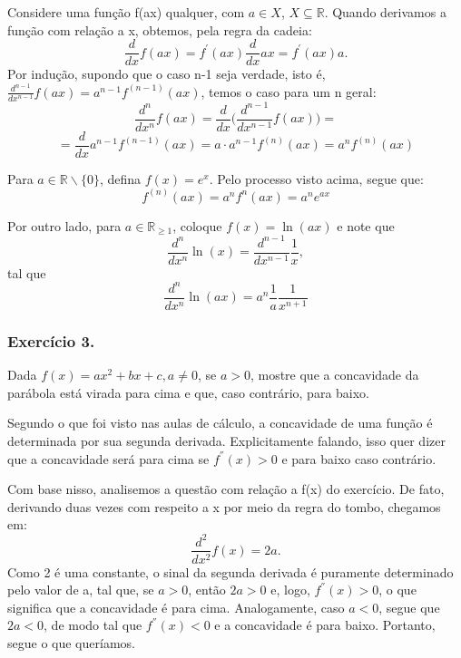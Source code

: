\begin{proof*}
	Considere uma fun\c c\~ao f(ax) qualquer, com $a\in{X}$, $X\subseteq{\mathbb{R}}$.
	Quando derivamos a fun\c c\~ao com rela\c c\~ao a x, obtemos, pela regra da
	cadeia:
	\[
		\frac{d}{dx}f(ax) = f^{'}(ax)\frac{d}{dx}ax = f^{'}(ax)a.
	\]
	Por indu\c c\~ao, supondo que o caso n-1 seja verdade, isto \'e,
	$\frac{d^{n-1}}{d x^{n-1}}f(ax) = a^{n-1}f^{(n-1)}(ax)$, temos o caso para um n
	geral:
	\[
		\frac{d^{n}}{d x^{n}}f(ax) = \frac{d}{dx}\biggl(\frac{d^{n-1}}{d x^{n-1}}f(ax)\biggr) =
	\]
	\[
		= \frac{d}{dx}a^{n-1}f^{(n-1)}(ax) = a\cdot{a^{n-1}}f^{(n)}(ax) = a^{n}f^{(n)}(ax)
	\]

	Para $a\in{\mathbb{R}\backslash\{0\}}$, defina $f(x) = e^{x}$. Pelo processo visto
	acima, segue que:
	\[
		f^{(n)}(ax) = a^{n}f^{n}(ax) = a^{n}e^{ax}
	\]

	Por outro lado, para $a\in{\mathbb{R}_{\geq1}}$, coloque $f(x) = \ln(ax)$ e
	note que
	\[
		\frac{d^{n}}{dx^{n}}\ln(x) = \frac{d^{n-1}}{dx^{n-1}}\frac{1}{x},
	\]
	tal que
	\[
		\frac{d^{n}}{dx^{n}}\ln(ax) = a^{n}\frac{1}{a}\frac{1}{x^{n+1}}
	\]
\end{proof*}

\subsubsection{Exerc\'icio 3.}
Dada $f(x) = ax^{2}+ bx + c, a\neq{0}$, se $a > 0$, mostre que a concavidade da
par\'abola est\'a virada para cima e que, caso contr\'ario, para baixo.

\begin{proof*}
	Segundo o que foi visto nas aulas de c\'alculo, a concavidade de uma fun\c c\~ao
	\'e determinada por sua segunda derivada. Explicitamente falando, isso quer
	dizer que a concavidade ser\'a para cima se $f^{''}(x) > 0$ e para baixo caso
	contr\'ario.

	Com base nisso, analisemos a quest\~ao com rela\c c\~ao a f(x) do exerc\'icio.
	De fato, derivando duas vezes com respeito a x por meio da regra do tombo,
	chegamos em:
	\[
		\frac{d^{2}}{dx^{2}}f(x) = 2a.
	\]
	Como 2 \'e uma constante, o sinal da segunda derivada \'e puramente
	determinado pelo valor de a, tal que, se $a > 0$, ent\~ao $2a > 0$ e, logo, $f^{''}
	(x) > 0$, o que significa que a concavidade \'e para cima. Analogamente, caso $a
	< 0$, segue que $2a < 0$, de modo tal que $f^{''}(x) < 0$ e a concavidade \'e
	para baixo. Portanto, segue o que quer\'iamos. \qedsymbol
\end{proof*}

